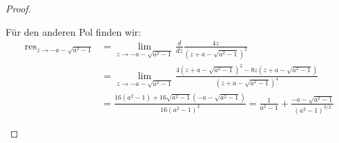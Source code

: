 \documentclass[11pt]{article}
\newcommand{\res}{\text{res}}
\begin{document}
\begin{proof}
\begin{enumerate}[label = (\alph*)]
            Für den anderen Pol finden wir:
            $$\begin{aligned}
                  \res_{z\to -a-\sqrt{a^2-1}} &= \lim_{z\to -a-\sqrt{a^2-1}}\frac{d}{dz}\frac{4z}{(z+a-\sqrt{a^2-1})^2}
                  \\& = \lim_{z\to -a-\sqrt{a^2-1}}\frac{4(z+a-\sqrt{a^2-1})^2-8z(z+a-\sqrt{a^2-1})}{(z+a-\sqrt{a^2-1})^4}\\
                  &= \frac{16(a^2-1)+16\sqrt{a^2-1}(-a-\sqrt{a^2-1})}{16(a^2-1)^2}
                  = \frac{1}{a^2-1}+\frac{-a-\sqrt{a^2-1}}{(a^2-1)^{3/2}}
            \end{aligned}$$
        \end{enumerate}
    \end{proof}
\end{document}
